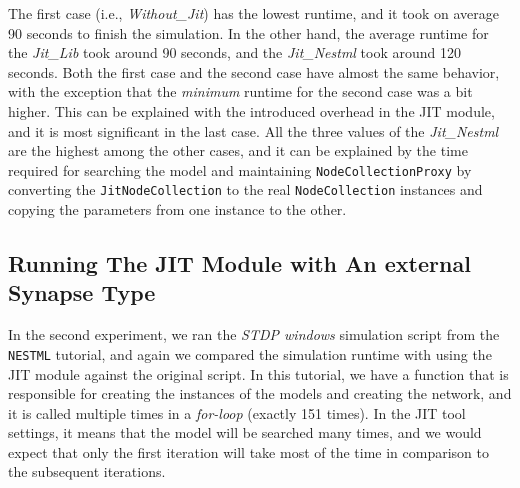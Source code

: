 The first case (i.e., \emph{Without\_Jit}) has the lowest runtime, and it took on average 90 seconds to finish the simulation. In the other hand, the average runtime for the \emph{Jit\_Lib} took around 90 seconds, and the \emph{Jit\_Nestml} took around 120 seconds.  Both the first case and the second case have almost the same behavior, with the exception that the \emph{minimum} runtime for the second case was a bit higher. This can be explained with the introduced overhead in the JIT module, and it is most significant in the last case. All the three values of the \emph{Jit\_Nestml} are the highest among the other cases, and it can be explained by the time required for searching the model and maintaining \texttt{NodeCollectionProxy} by converting the \texttt{JitNodeCollection} to the real \texttt{NodeCollection} instances and copying the parameters from one instance to the other.


\subsection*{Running The JIT Module with An external Synapse Type}

In the second experiment, we ran the \emph{STDP windows} simulation script from the \texttt{NESTML} tutorial, and again we compared the simulation runtime with using the JIT module against the original script. In this tutorial, we have a function that is responsible for creating the instances of the models and creating the network, and it is called multiple times in a \emph{for-loop} (exactly 151 times). In the JIT tool settings, it means that the model will be searched many times, and we would expect that only the first iteration will take most of the time in comparison to the subsequent iterations. 

